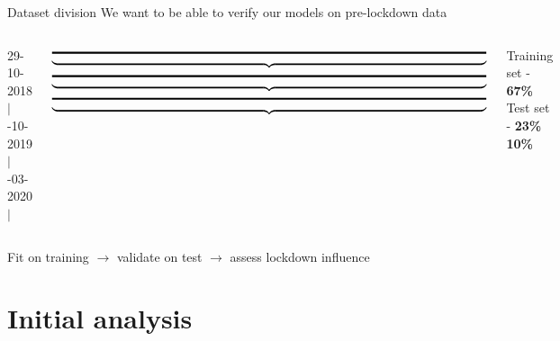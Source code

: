 \documentclass{beamer}
\begin{document}
\begin{frame}{Dataset division}\centering
	We want to be able to verify our models on pre-lockdown data
	\vspace{0.1\textheight}
	\begin{columns}
		\begin{columns}
			\hspace{-.005\textwidth}29-10-2018\\\hspace{-.005\textwidth}\tiny$\vert$
			-10-2019\\\tiny$\vert$
			-03-2020\\\tiny$\vert$
		\end{columns}
		\begin{columns}
			$\underbrace{\rule[.5em]{\textwidth}{0.15em}}$
			$\underbrace{\rule[.5em]{\textwidth}{0.15em}}$
			$\underbrace{\rule[.5em]{\textwidth}{0.15em}}$
		\end{columns}
		\begin{columns}
			\centering
			Training set - \textbf{67\%}
			\centering
			\hspace{-.3em}Test set - \textbf{23\%}\hspace{-.3em}
			\centering
			\textbf{10\%}
		\end{columns}
	\end{columns}
	\vspace{0.1\textheight}
	Fit on training $\rightarrow$ validate on test $\rightarrow$ assess lockdown influence
\end{frame}

\section{Initial analysis}
\end{document}
